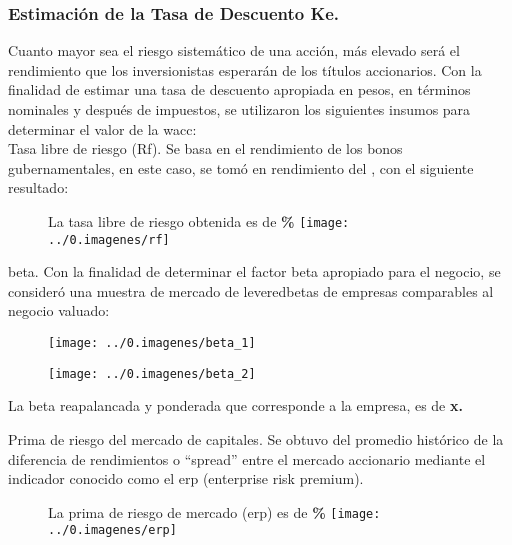 \subsubsection{Estimaci\'on de la Tasa de Descuento Ke.}

Cuanto mayor sea el riesgo sistem\'atico de una acci\'on, m\'as elevado ser\'a el rendimiento que los inversionistas esperar\'an de los t\'itulos accionarios. Con la finalidad de estimar una tasa de descuento apropiada en pesos, en t\'erminos nominales y despu\'es de impuestos, se utilizaron los siguientes insumos para determinar el valor de la \gls{wacc}:\\


\textcolor{principal}{Tasa libre de riesgo (Rf).} Se basa en el rendimiento de los bonos gubernamentales, en este caso, se tom\'o en rendimiento del \textcolor{principal}{\rfBase}, con el siguiente resultado:

\begin{figure}[H]
\centering
La tasa libre de riesgo obtenida es de \textbf{\rfValor\%} \texttt{[image: ../0.imagenes/rf]}
\end{figure}

\gls{beta}. Con la finalidad de determinar el factor \gls{beta} apropiado para el negocio, se consider\'o una muestra de mercado de \glspl{leveredbeta} de empresas comparables al negocio valuado:

\espacio{4cm}
\begin{figure}[H]
\centering
\texttt{[image: ../0.imagenes/beta\_1]}\\
\end{figure}


\begin{figure}[H]
\centering
\texttt{[image: ../0.imagenes/beta\_2]}
\end{figure}


La beta reapalancada y ponderada que corresponde a la empresa, es de \textcolor{principal}{\textbf{\beta x.}}\\

\newpage



\textcolor{principal}{Prima de riesgo del mercado de capitales}. Se obtuvo del promedio hist\'orico de la diferencia de rendimientos o ``spread'' entre el mercado accionario \mercadoAccionario mediante el indicador conocido como el \gls{erp} (enterprise risk premium).\\

\begin{figure}[H]
\centering
La prima de riesgo de mercado (\gls{erp}) es de \textbf{\textcolor{principal}{\erpValor\%}} \texttt{[image: ../0.imagenes/erp]}
\end{figure}

